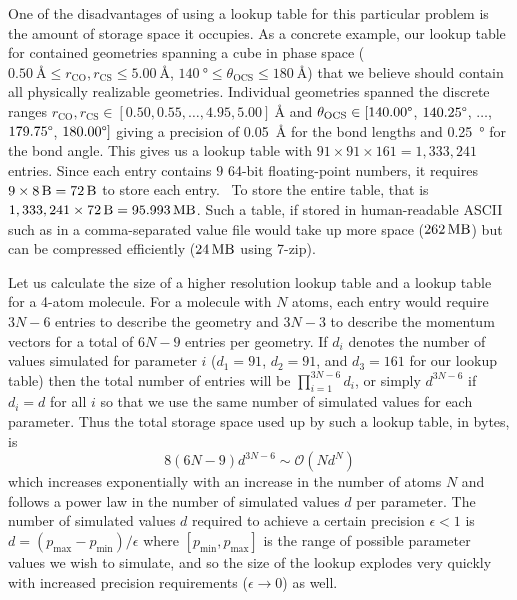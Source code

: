 One of the disadvantages of using a lookup table for this particular problem is the amount of storage space it occupies.  As a concrete example, our lookup table for  contained geometries spanning a cube in phase space ($\SI{0.50}{\angstrom} \le r_\mathrm{CO}, r_\mathrm{CS} \le \SI{5.00}{\angstrom}$, $\SI{140}{\degree} \le \theta_\mathrm{OCS} \le \SI{180}{\angstrom}$) that we believe should contain all physically realizable geometries. Individual geometries spanned the discrete ranges $r_\mathrm{CO}, r_\mathrm{CS} \in [0.50, 0.55, \dots, 4.95, 5.00] \SI{}{\angstrom}$ and $\theta_\mathrm{OCS} \in [140.00\degree$, $140.25\degree$, $\dots$, $179.75\degree$, $180.00\degree]$ giving a precision of \SI{0.05}{\angstrom} for the bond lengths and \SI{0.25}{\degree} for the bond angle. This gives us a lookup table with $91 \times 91 \times 161 = 1,333,241$ entries. Since each entry contains $9$ 64-bit floating-point numbers, it requires $9 \times \SI{8}{\byte} = \SI{72}{\byte}$ to store each entry.\footnotemark~ To store the entire table, that is $1,333,241 \times \SI{72}{\byte} = \SI{95.993}{\mega\byte}$. Such a table, if stored in human-readable ASCII such as in a comma-separated value file would take up more space ($\SI{262}{\mega\byte}$) but can be compressed efficiently ($\SI{24}{\mega\byte}$ using 7-zip).


Let us calculate the size of a higher resolution lookup table and a lookup table for a 4-atom molecule. For a molecule with $N$ atoms, each entry would require $3N-6$ entries to describe the geometry and $3N-3$ to describe the momentum vectors for a total of $6N-9$ entries per geometry. If $d_i$ denotes the number of values simulated for parameter $i$ (\eg $d_1 = 91$, $d_2 = 91$, and $d_3 = 161$ for our lookup table) then the total number of entries will be $\displaystyle \prod\limits_{i=1}^{3N-6} d_i$, or simply $d^{3N-6}$ if $d_i = d$ for all $i$ so that we use the same number of simulated values for each parameter. Thus the total storage space used up by such a lookup table, in bytes, is
\begin{equation}
8(6N-9)d^{3N-6}\sim \mathcal{O}(Nd^{N})
\end{equation}
which increases exponentially with an increase in the number of atoms $N$ and follows a power law in the number of simulated values $d$ per parameter. The number of simulated values $d$ required to achieve a certain precision $\epsilon < 1$ is $d = (p_\mathrm{max} - p_\mathrm{min})/\epsilon$ where $[p_\mathrm{min}, p_\mathrm{max}]$ is the range of possible parameter values we wish to simulate, and so the size of the lookup explodes very quickly with increased precision requirements ($\epsilon \rightarrow 0$) as well.

